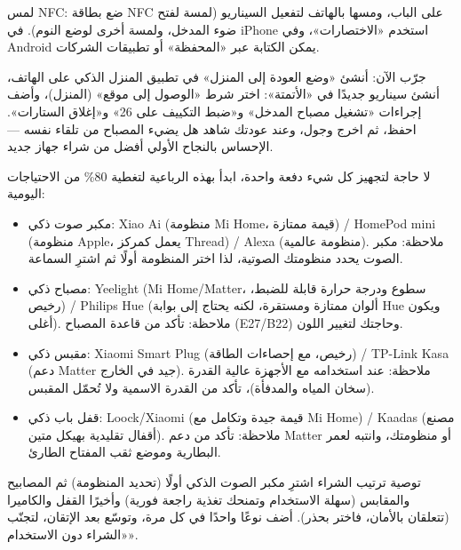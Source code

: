 لمس NFC: ضع بطاقة NFC على الباب، ومسها بالهاتف لتفعيل السيناريو (لمسة لفتح ضوء المدخل، ولمسة أخرى لوضع النوم). في iPhone استخدم «الاختصارات»، وفي Android يمكن الكتابة عبر «المحفظة» أو تطبيقات الشركات.

\begin{tcbpractice}{جرّب الآن: أنشئ «وضع العودة إلى المنزل»}
في تطبيق المنزل الذكي على الهاتف، أنشئ سيناريو جديدًا في «الأتمتة»: اختر شرط «الوصول إلى موقع» (المنزل)، وأضف إجراءات «تشغيل مصباح المدخل» و«ضبط التكييف على 26» و«إغلاق الستارات». احفظ، ثم اخرج وجول، وعند عودتك شاهد هل يضيء المصباح من تلقاء نفسه — الإحساس بالنجاح الأولي أفضل من شراء جهاز جديد.

\end{tcbpractice}


لا حاجة لتجهيز كل شيء دفعة واحدة، ابدأ بهذه الرباعية لتغطية 80\% من الاحتياجات اليومية:

\begin{itemize}
  \item مكبر صوت ذكي: Xiao Ai (منظومة Mi Home، قيمة ممتازة) / HomePod mini (منظومة Apple، يعمل كمركز Thread) / Alexa (منظومة عالمية). ملاحظة: مكبر الصوت يحدد منظومتك الصوتية، لذا اختر المنظومة أولًا ثم اشترِ السماعة.
  \item مصباح ذكي: Yeelight (Mi Home/Matter، سطوع ودرجة حرارة قابلة للضبط، رخيص) / Philips Hue (ألوان ممتازة ومستقرة، لكنه يحتاج إلى بوابة Hue ويكون أغلى). ملاحظة: تأكد من قاعدة المصباح (E27/B22) وحاجتك لتغيير اللون.
  \item مقبس ذكي: Xiaomi Smart Plug (رخيص، مع إحصاءات الطاقة) / TP-Link Kasa (دعم Matter جيد في الخارج). ملاحظة: عند استخدامه مع الأجهزة عالية القدرة (سخان المياه والمدفأة)، تأكد من القدرة الاسمية ولا تُحمّل المقبس.
  \item قفل باب ذكي: Loock/Xiaomi (قيمة جيدة وتكامل مع Mi Home) / Kaadas (مصنع أقفال تقليدية بهيكل متين). ملاحظة: تأكد من دعم Matter أو منظومتك، وانتبه لعمر البطارية وموضع ثقب المفتاح الطارئ.
\end{itemize}

\begin{tcbinfo}{توصية ترتيب الشراء}
اشترِ مكبر الصوت الذكي أولًا (تحديد المنظومة) ثم المصابيح والمقابس (سهلة الاستخدام وتمنحك تغذية راجعة فورية) وأخيرًا القفل والكاميرا (تتعلقان بالأمان، فاختر بحذر). أضف نوعًا واحدًا في كل مرة، وتوسّع بعد الإتقان، لتجنّب «الشراء دون الاستخدام».

\end{tcbinfo}

